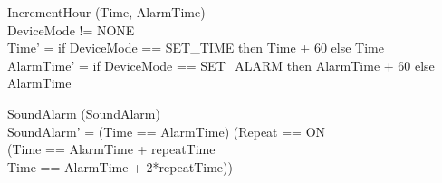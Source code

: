 \documentclass[Main_Assignment2]{subfiles}
\begin{document}
\begin{schema}{IncrementHour}
\Delta (Time, AlarmTime) \\
\where
DeviceMode\; != NONE\\
Time' = if\; DeviceMode == SET\_TIME\; then\; Time + 60\; else\; Time\\
AlarmTime' = if\; DeviceMode == SET\_ALARM\; then\; AlarmTime + 60\; else\; AlarmTime\\
\end{schema}

\begin{schema}{SoundAlarm}
\Delta (SoundAlarm) \\
\where
SoundAlarm' = (Time == AlarmTime) \vee (Repeat == ON \wedge \\
\hspace{80pt} (Time == AlarmTime + repeatTime\; \vee \\
\hspace{90pt}Time == AlarmTime + 2*repeatTime))
\end{schema}
\end{document}
